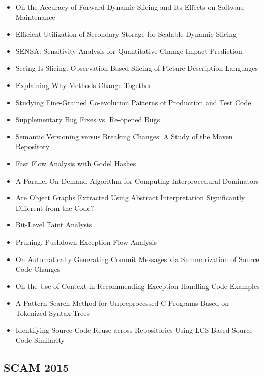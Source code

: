 {\begin{itemize}[itemsep=-1ex]
  \item On the Accuracy of Forward Dynamic Slicing and Its Effects on Software Maintenance
  \item Efficient Utilization of Secondary Storage for Scalable Dynamic Slicing
  \item SENSA: Sensitivity Analysis for Quantitative Change-Impact Prediction {\color{blue} \checkmark}{\color{red} \texttimes}
  \item Seeing Is Slicing: Observation Based Slicing of Picture Description Languages
  \item Explaining Why Methods Change Together
  \item Studying Fine-Grained Co-evolution Patterns of Production and Test Code
  \item Supplementary Bug Fixes vs. Re-opened Bugs
  \item Semantic Versioning versus Breaking Changes: A Study of the Maven Repository
  \item Fast Flow Analysis with Godel Hashes {\color{blue} \checkmark}{\color{red} \texttimes}
  \item A Parallel On-Demand Algorithm for Computing Interprocedural Dominators {\color{blue} \checkmark}{\color{red} \texttimes}
  \item Are Object Graphs Extracted Using Abstract Interpretation Significantly Different from the Code? {\color{blue} \checkmark}{\color{red} \texttimes}
  \item Bit-Level Taint Analysis
  \item Pruning, Pushdown Exception-Flow Analysis
  \item On Automatically Generating Commit Messages via Summarization of Source Code Changes {\color{blue} \checkmark}{\color{red} \texttimes}
  \item On the Use of Context in Recommending Exception Handling Code Examples {\color{blue} \checkmark}{\color{red} \texttimes}
  \item A Pattern Search Method for Unpreprocessed C Programs Based on Tokenized Syntax Trees {\color{blue} \checkmark}{\color{red} \texttimes}
  \item Identifying Source Code Reuse across Repositories Using LCS-Based Source Code Similarity
\end{itemize}
}

\subsection{SCAM 2015}


